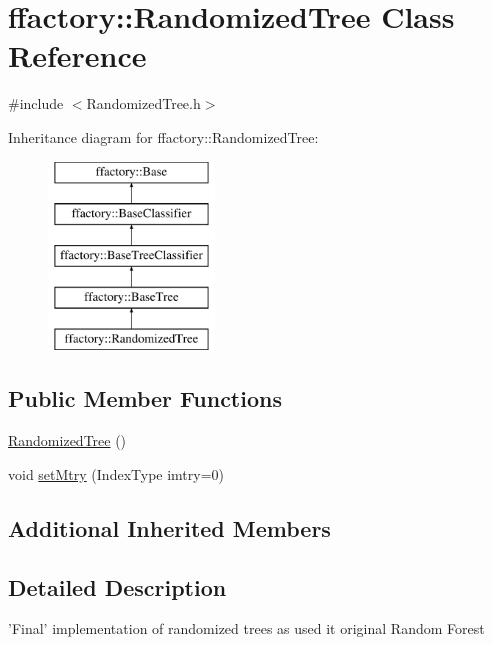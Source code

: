 \hypertarget{classffactory_1_1_randomized_tree}{\section{ffactory\-:\-:Randomized\-Tree Class Reference}
\label{classffactory_1_1_randomized_tree}
}


{\ttfamily \#include $<$Randomized\-Tree.\-h$>$}

Inheritance diagram for ffactory\-:\-:Randomized\-Tree\-:\begin{figure}[H]
\begin{center}
\leavevmode
\includegraphics[height=5.000000cm]{classffactory_1_1_randomized_tree}
\end{center}
\end{figure}
\subsection*{Public Member Functions}
\begin{DoxyCompactItemize}
\item 
\hyperlink{classffactory_1_1_randomized_tree_a17a9eee17b97e9ce60aee2599586402e}{Randomized\-Tree} ()
\item 
void \hyperlink{classffactory_1_1_randomized_tree_a09eddda52606945920c3b34ca5ecbf9e}{set\-Mtry} (Index\-Type imtry=0)
\end{DoxyCompactItemize}
\subsection*{Additional Inherited Members}


\subsection{Detailed Description}
'Final' implementation of randomized trees as used it original Random Forest 

